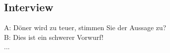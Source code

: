 \subsection{Interview}
A: Döner wird zu teuer, stimmen Sie der Aussage zu?\\
B: Dies ist ein schwerer Vorwurf!\\
...